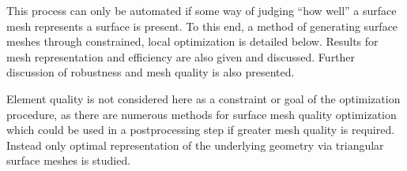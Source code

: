 This process can only be automated if some way of judging ``how well'' a
surface mesh represents a surface is present. To this end, a method of
generating surface meshes through constrained, local optimization is
detailed below. Results for mesh representation and efficiency are also
given and discussed.  Further discussion of robustness and mesh quality
is also presented.

Element quality is not considered here as a constraint or goal of the 
optimization procedure, as there
are numerous methods for surface mesh quality optimization
\cite{frey1998,garimella2002,garimella2004a,garimella2004b,jiao2005,jiao2006,jiao2011,jiao2013,lopez2008,montenegro2005,montenegro2006,montenegro2008,montenegro2011,roca2012,roca2013,shivanna2010,zhang2009}
which could be used in a postprocessing step if greater mesh quality is
required.  Instead only optimal representation of the underlying
geometry via triangular surface meshes is studied.
